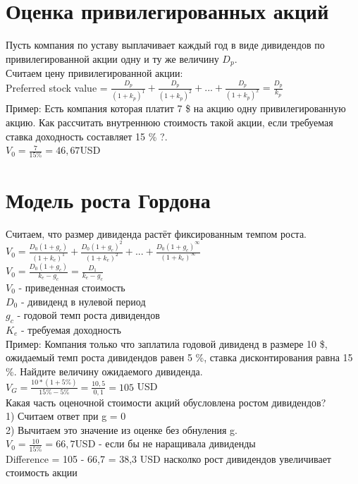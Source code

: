 \documentclass{article}
\begin{document}
\section{Оценка привилегированных акций}

Пусть компания по уставу выплачивает каждый год в виде дивидендов по привилегированной акции одну и ту же величину $D_p$.\\
Считаем цену привилегированной акции:\\
Preferred stock value = $\frac{D_p}{(1+k_p)^1} + \frac{D_p}{(1+k_p)^2} + ... + \frac{D_p}{(1+k_p)^x} = \frac{D_p}{k_p}$\\
Пример: Есть компания которая платит 7 \$ на акцию одну привилегированную акцию. Как рассчитать внутреннюю стоимость такой акции, если требуемая ставка доходность составляет 15 \% ?.\\
$V_0 = \frac{7}{15\%} = 46,67$USD\\

\section{Модель роста Гордона}
Считаем, что размер дивиденда растёт фиксированным темпом роста.\\ 
$V_0 = \frac{D_0 (1 + g_c)}{(1 + k_e)^1} + \frac{D_0 (1 + g_c)^2}{(1 + k_e)^2} + ... + \frac{D_0 (1 + g_c)^{\infty}}{(1 + k_e)^{\infty}}$\\
$V_0 = \frac{D_0 (1+g_c)}{k_e - g_c} = \frac{D_1}{k_e - g_c}$\\
$V_0$ - приведенная стоимость\\
$D_0$ - дивиденд в нулевой период\\
$g_c$ - годовой темп роста дивидендов\\
$K_e$ - требуемая доходность\\
Пример: Компания только что заплатила годовой дивиденд в размере 10 \$, ожидаемый темп роста
дивидендов равен 5 \%, ставка дисконтирования равна 15 \%.  Найдите величину ожидаемого дивиденда.\\
$V_G = \frac{10*(1+5\%)}{15\% - 5\%} = \frac{10,5}{0,1} = 105$ USD\\
Какая часть оценочной стоимости акций обусловлена ростом дивидендов?\\
1) Считаем ответ при g = 0\\
2) Вычитаем это значение из оценке без обнуления g.\\
$V_0 = \frac{10}{15\%} = 66,7$USD - если бы не наращивала дивиденды\\
Difference =  105 - 66,7 = 38,3 USD насколко рост дивидендов увеличивает стоимость акции
\end{document}
